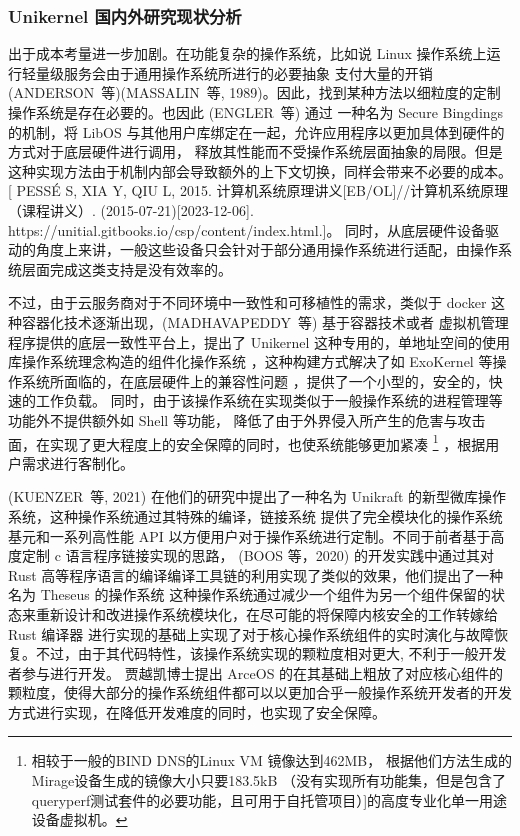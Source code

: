 \subsubsection{Unikernel 国内外研究现状分析}

出于成本考量进一步加剧。在功能复杂的操作系统，比如说 Linux 操作系统上运行轻量级服务会由于通用操作系统所进行的必要抽象
支付大量的开销(ANDERSON 等)(MASSALIN 等, 1989)。因此，找到某种方法以细粒度的定制操作系统是存在必要的。也因此 (ENGLER 等) 通过
一种名为 Secure Bingdings 的机制，将 LibOS 与其他用户库绑定在一起，允许应用程序以更加具体到硬件的方式对于底层硬件进行调用，
释放其性能而不受操作系统层面抽象的局限。但是这种实现方法由于机制内部会导致额外的上下文切换，同样会带来不必要的成本。
[ PESSÉ S, XIA Y, QIU L, 2015. 计算机系统原理讲义[EB/OL]//计算机系统原理（课程讲义）. (2015-07-21)[2023-12-06]. https://unitial.gitbooks.io/csp/content/index.html.]。
同时，从底层硬件设备驱动的角度上来讲，一般这些设备只会针对于部分通用操作系统进行适配，由操作系统层面完成这类支持是没有效率的。

不过，由于云服务商对于不同环境中一致性和可移植性的需求，类似于 docker 这种容器化技术逐渐出现，(MADHAVAPEDDY 等) 基于容器技术或者
虚拟机管理程序提供的底层一致性平台上，提出了 Unikernel 这种专用的，单地址空间的使用库操作系统理念构造的组件化操作系统
，这种构建方式解决了如 ExoKernel 等操作系统所面临的，在底层硬件上的兼容性问题 ，提供了一个小型的，安全的，快速的工作负载。
同时，由于该操作系统在实现类似于一般操作系统的进程管理等功能外不提供额外如 Shell 等功能，
降低了由于外界侵入所产生的危害与攻击面，在实现了更大程度上的安全保障的同时，也使系统能够更加紧凑
\footnote{相较于一般的BIND DNS的Linux VM 镜像达到462MB，
根据他们方法生成的Mirage设备生成的镜像大小只要183.5kB
（没有实现所有功能集，但是包含了queryperf测试套件的必要功能，且可用于自托管项目）]的高度专业化单一用途设备虚拟机。 }
，根据用户需求进行客制化。

(KUENZER 等, 2021) 在他们的研究中提出了一种名为 Unikraft 的新型微库操作系统，这种操作系统通过其特殊的编译，链接系统
提供了完全模块化的操作系统基元和一系列高性能 API 以方便用户对于操作系统进行定制。不同于前者基于高度定制 c 语言程序链接实现的思路，
(BOOS 等，2020) 的开发实践中通过其对 Rust 高等程序语言的编译编译工具链的利用实现了类似的效果，他们提出了一种名为 Theseus 的操作系统
这种操作系统通过减少一个组件为另一个组件保留的状态来重新设计和改进操作系统模块化，在尽可能的将保障内核安全的工作转嫁给 Rust 编译器
进行实现的基础上实现了对于核心操作系统组件的实时演化与故障恢复。不过，由于其代码特性，该操作系统实现的颗粒度相对更大,
不利于一般开发者参与进行开发。
贾越凯博士提出 ArceOS 的在其基础上粗放了对应核心组件的颗粒度，使得大部分的操作系统组件都可以以更加合乎一般操作系统开发者的开发
方式进行实现，在降低开发难度的同时，也实现了安全保障。


